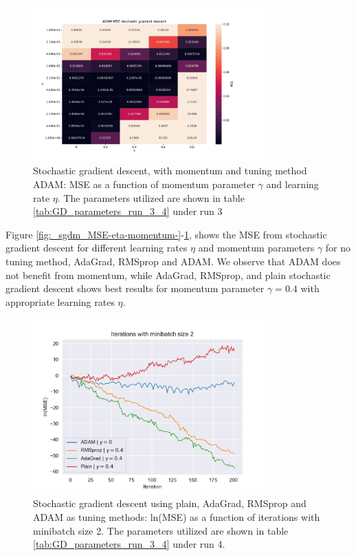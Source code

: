 \begin{figure}[H]
\centering
\includegraphics[width=0.8\textwidth]{Figures/PartA/ADAM_sgdm_MSE(eta,momentum)}
\caption{Stochastic gradient descent, with momentum and tuning method ADAM: MSE
    as a function of momentum parameter $\gamma$ and learning rate \(\eta \). The parameters utilized are shown in table \ref{tab:GD_parameters_run_3_4} under run 3	 }
\label{fig:ADAM_sgdm_MSE-eta-momentum-}
\end{figure}

Figure \ref{fig:_sgdm_MSE-eta-momentum-}-\ref{fig:ADAM_sgdm_MSE-eta-momentum-}, shows the MSE from stochastic gradient descent for different
learning rates $\eta $ and momentum parameters $\gamma $ for no tuning method, AdaGrad, RMSprop and ADAM. We observe that ADAM does not benefit 
from momentum, while AdaGrad, RMSprop, and plain stochastic gradient descent shows best results for momentum parameter $\gamma =0.4$ with appropriate 
learning rates $\eta $.  


\begin{figure}[H]
\centering
\includegraphics[width=0.8\textwidth]{Figures/PartA/minibatch_2_MSE(iter).pdf}
\caption{Stochastic gradient descent using plain, AdaGrad, RMSprop and ADAM as tuning methods: ln(MSE) as a function of iterations with minibatch size 2.
The parameters utilized are shown in table \ref{tab:GD_parameters_run_3_4} under run 4.}
\label{fig:minibatch_2_MSE-iter}
\end{figure}

